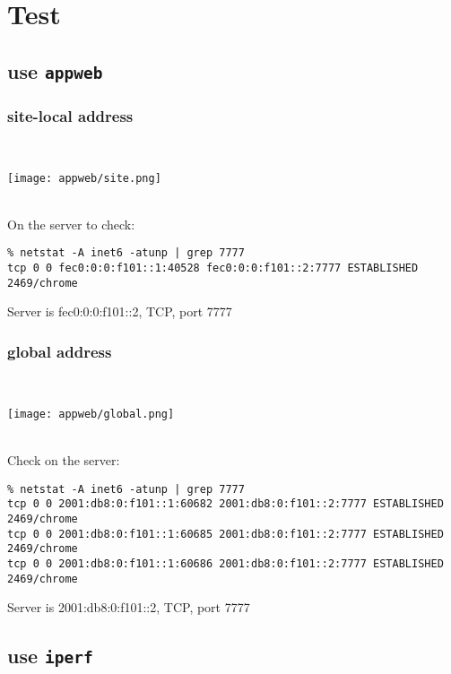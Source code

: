 \documentclass[a4paper]{report}
\begin{document}
\section{Test}
\subsection{use {\tt appweb}}
\label{IPv6-appweb}
\subsubsection{site-local address}
\\[\intextsep]
\begin{minipage}{\textwidth}
\centering
\texttt{[image: appweb/site.png]}
\end{minipage}
\\[\intextsep]
On the server to check:
\begin{lstlisting}
% netstat -A inet6 -atunp | grep 7777          
tcp 0 0 fec0:0:0:f101::1:40528 fec0:0:0:f101::2:7777 ESTABLISHED 2469/chrome
\end{lstlisting}
Server is fec0:0:0:f101::2, TCP, port 7777
\subsubsection{global address}
\\[\intextsep]
\begin{minipage}{\textwidth}
\centering
\texttt{[image: appweb/global.png]}
\end{minipage}
\\[\intextsep]
Check on the server:
\begin{lstlisting}
% netstat -A inet6 -atunp | grep 7777         
tcp 0 0 2001:db8:0:f101::1:60682 2001:db8:0:f101::2:7777 ESTABLISHED 2469/chrome  
tcp 0 0 2001:db8:0:f101::1:60685 2001:db8:0:f101::2:7777 ESTABLISHED 2469/chrome  
tcp 0 0 2001:db8:0:f101::1:60686 2001:db8:0:f101::2:7777 ESTABLISHED 2469/chrome
\end{lstlisting}
Server is 2001:db8:0:f101::2, TCP, port 7777
\subsection{use {\tt iperf}}
\label{IPv6-iperf}
\end{document}
